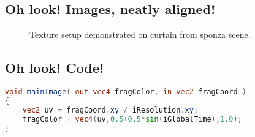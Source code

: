 \documentclass[thesis.tex]{subfiles}
\begin{document}
\subsection{Oh look! Images, neatly aligned!}
\begin{figure}[h!]
\centering
{}
\caption{Texture setup demonstrated on curtain from sponza scene.}
\label{fig:texturesample}
\end{figure}

\subsection{Oh look! Code!} \label{sec:impl:cachealloc}


\begin{lstlisting}[language=GLSL]
void mainImage( out vec4 fragColor, in vec2 fragCoord )
{
	vec2 uv = fragCoord.xy / iResolution.xy;
	fragColor = vec4(uv,0.5+0.5*sin(iGlobalTime),1.0);
}
\end{lstlisting}

\subfilebib %
\end{document}
